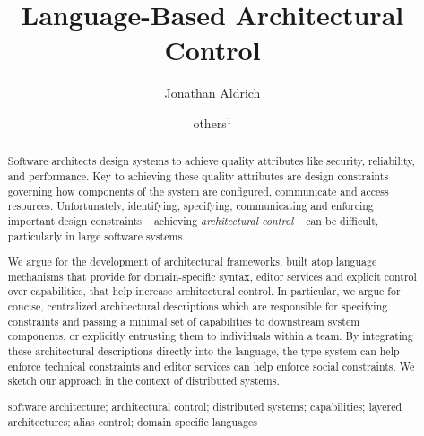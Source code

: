 \documentclass[runningheads]{llncs}
\newcommand{\keywords}[1]{\par\addvspace\baselineskip
\noindent\keywordname\enspace\ignorespaces#1}
\begin{document}
\title{Language-Based Architectural Control}
\author{Jonathan Aldrich \and others$^{1}$}
\setlength{\abovecaptionskip}{0pt}
\setlength{\belowcaptionskip}{0pt}

\maketitle

\begin{sloppypar}
\begin{abstract}
Software architects design systems to achieve quality attributes like security, reliability, and performance. Key to achieving these quality attributes are design constraints governing how components of the system  are configured, communicate and access resources. Unfortunately, identifying, specifying, communicating and enforcing important design  constraints -- achieving \emph{architectural control} -- can be difficult, particularly in large software systems.

We argue for the development of architectural frameworks, built atop language mechanisms that provide for  domain-specific syntax, editor services and explicit control over capabilities, that help increase architectural control. In particular, we argue for concise, centralized architectural descriptions which are responsible for specifying constraints and passing a minimal set of capabilities to downstream system components, or explicitly entrusting them to individuals within a team. By integrating these architectural descriptions directly into the language, the type system can help enforce technical constraints and editor services can help enforce social constraints. We sketch our approach in the context of distributed systems.

\keywords{software architecture;
architectural control;
distributed systems;
capabilities;
layered architectures;
alias control;
domain specific languages}

\end{abstract}


\end{sloppypar}
\end{document}
